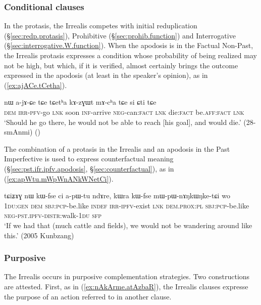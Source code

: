\subsubsection{Conditional clauses} \label{sec:irrealis.conditional}
In the protasis, the Irrealis competes with initial reduplication (§\ref{sec:redp.protasis}), Prohibitive (§\ref{sec:prohib.function}) and Interrogative (§\ref{sec:interrogative.W.function}). When the apodosis is in the Factual Non-Past, the Irrealis protasis expresses a condition whose probability of being realized may not be high, but which, if it is verified, almost certainly brings the outcome expressed in the apodosis (at least in the speaker's opinion), as in (\ref{ex:ajACe.tCetha}).

\begin{exe}
\ex \label{ex:ajACe.tCetha}
\gll nɯ a-jɤ-ɕe tɕe tɕetʰa kɤ-zɣɯt mɤ-cʰa tɕe si ɕti tɕe \\
\textsc{dem} \textsc{irr}-\textsc{pfv}-go \textsc{lnk} soon \textsc{inf}-arrive \textsc{neg}-can:\textsc{fact} \textsc{lnk} die:\textsc{fact} be.\textsc{aff}:\textsc{fact} \textsc{lnk} \\
\glt `Should he go there, he would not be able to reach [his goal], and would die.' (28-smAnmi)
()
\end{exe}

The combination of a protasis in the Irrealis and an apodosis in the Past Imperfective is used to express counterfactual meaning (§\ref{sec:pst.ifr.ipfv.apodosis}, §\ref{sec:counterfactual}), as in (\ref{ex:apWtu.mWpWnANkWNetCi}).

\begin{exe}
\ex \label{ex:apWtu.mWpWnANkWNetCi}
\gll tɕiʑɤɣ nɯ kɯ-fse ci a-pɯ-tu ndɤre, kɯra kɯ-fse mɯ-pɯ-nɤŋkɯŋke-tɕi wo \\
\textsc{1du}:\textsc{gen} \textsc{dem} \textsc{sbj}:\textsc{pcp}-be.like \textsc{indef} \textsc{irr}-\textsc{ipfv}-exist \textsc{lnk} \textsc{dem}.\textsc{prox}:\textsc{pl} \textsc{sbj}:\textsc{pcp}-be.like \textsc{neg}-\textsc{pst}.\textsc{ipfv}-\textsc{distr}:walk-\textsc{1du} \textsc{sfp} \\
\glt `If we had that (much cattle and fields), we would not be wandering around like this.' (2005 Kunbzang)
\end{exe}


\subsubsection{Purposive} \label{sec:irrealis.purposive}
The Irrealis occurs in purposive complementation strategies. Two constructions are attested. First, as in (\ref{ex:nAkArme.atAzbaR}), the Irrealis clauses expresse the purpose of an action referred to in another clause.

